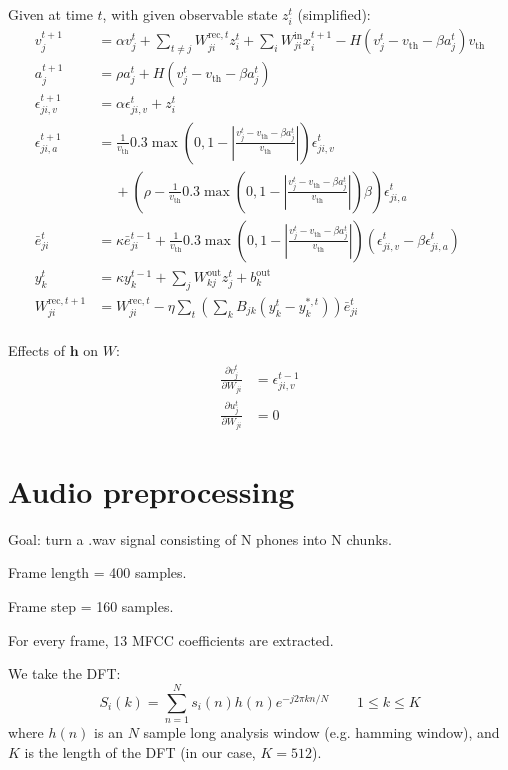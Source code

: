 \documentclass{article}
\begin{document}
Given at time $t$, with given observable state $z_i^t$ (simplified):
\begin{align}
v^{t+1}_j &= \alpha v_j^t + \sum_{t\neq j} W^{\text{rec}, t}_{ji} z_i^t + \sum_i W^\text{in}_{ji}x_i^{t+1} - H\left(v_j^t-v_\text{th}-\beta a^t_j\right)v_\text{th}\\
a^{t+1}_j &= \rho a_j^t + H\left(v_j^t-v_\text{th}-\beta a^t_j\right)\\
\epsilon_{ji,v}^{t+1} &= \alpha\epsilon_{ji,v}^t + z_i^t\\
\epsilon_{ji,a}^{t+1} &= \frac{1}{v_\text{th}}0.3\max\left(0, 1-\left|\frac{v_j^t-v_\text{th}-\beta a^t_j}{v_\text{th}}\right|\right)\epsilon^t_{ji,v} \\ &\quad \ + \left(\rho-\frac{1}{v_\text{th}}0.3\max\left(0, 1-\left|\frac{v_j^t-v_\text{th}-\beta a^t_j}{v_\text{th}}\right|\right)\beta\right)\epsilon^t_{ji,a}\\
\bar{e}^t_{ji} &= \kappa\bar{e}^{t-1}_{ji} + \frac{1}{v_\text{th}}0.3\max\left(0, 1-\left|\frac{v_j^t-v_\text{th}-\beta a^t_j}{v_\text{th}}\right|\right)\left(\epsilon^t_{ji,v} - \beta\epsilon^t_{ji,a}\right)\\
y^t_k &= \kappa y^{t-1}_k + \sum_j W^\text{out}_{kj}z^t_j+b^\text{out}_k\\
W^{\text{rec}, t+1}_{ji} &= W^{\text{rec}, t}_{ji} -\eta\sum_t\left(\sum_kB_{jk}\left(y_k^t-y_k^{*,t}\right)\right)\bar{e}^t_{ji}\\
\end{align}



Effects of $\mathbf{h}$ on $W$:
\begin{align}
\frac{\partial v_j^t}{\partial W_{ji}} &= \epsilon_{ji,v}^{t-1} \\
\frac{\partial u_j^t}{\partial W_{ji}} &= 0
\end{align}


\newpage
\section{Audio preprocessing}
Goal: turn a .wav signal consisting of N phones into N chunks.

Frame length = 400 samples.

Frame step = 160 samples.

For every frame, 13 MFCC coefficients are extracted.

We take the DFT:
\begin{equation}
S_i(k) = \sum_{n=1}^N s_i(n)h(n)e^{-j2\pi kn/N}\qquad1\leq k\leq K
\end{equation}
where $h(n)$ is an $N$ sample long analysis window (e.g. hamming window), and $K$ is the length of the DFT (in our case, $K=512$).
\end{document}
